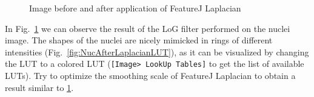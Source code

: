 \documentclass[11pt,a4paper,oneside]{report}
\newcommand{\ijmenu}[1]{\texttt{\small#1}}
\begin{document}
\begin{enumerate}
    \begin{figure}[h!tbp]
        \centering
        \quad
         \quad
         \caption{Image before and after application of FeatureJ Laplacian}
         \label{fig:nucleiLaplacian}
    \end{figure}

In Fig.~\ref{fig:nucleiLaplacian} we can observe the result of the LoG filter performed on the nuclei image. The shapes of the nuclei are nicely mimicked in rings of different intensities (Fig.~\ref{fig:NucAfterLaplacianLUT}), as it can be visualized by changing the LUT to a colored LUT (\ijmenu{[Image> LookUp Tables]} to get the list of available LUTs). Try to optimize the smoothing scale of FeatureJ Laplacian to obtain a result similar to \ref{fig:nucleiLaplacian}.


\end{enumerate}
\end{document}
